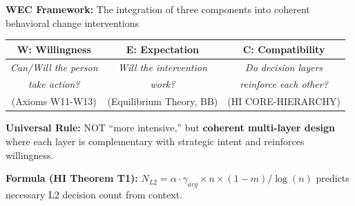 \documentclass[11pt, a4paper]{article}
\begin{document}

\begin{tcolorbox}[colback=blue!5!white, colframe=blue!75!black, title=Quick Reference: What is WEC Coherence?]

\textbf{WEC Framework:} The integration of three components into coherent behavioral change interventions

\begin{center}
\begin{tabular}{|c|c|c|}
\hline
\textbf{W: Willingness} & \textbf{E: Expectation} & \textbf{C: Compatibility} \\
\hline
\textit{Can/Will the person} & \textit{Will the intervention} & \textit{Do decision layers} \\
\textit{take action?} & \textit{work?} & \textit{reinforce each other?} \\
(Axioms W11-W13) & (Equilibrium Theory, BB) & (HI CORE-HIERARCHY) \\
\hline
\end{tabular}
\end{center}

\textbf{Universal Rule:} NOT ``more intensive,'' but \textbf{coherent multi-layer design} where each layer is complementary with strategic intent and reinforces willingness.

\textbf{Formula (HI Theorem T1):} $N_{L2} = \alpha \cdot \gamma_{avg} \times n \times (1-m) / \log(n)$ predicts necessary L2 decision count from context.

\end{tcolorbox}

\end{document}
